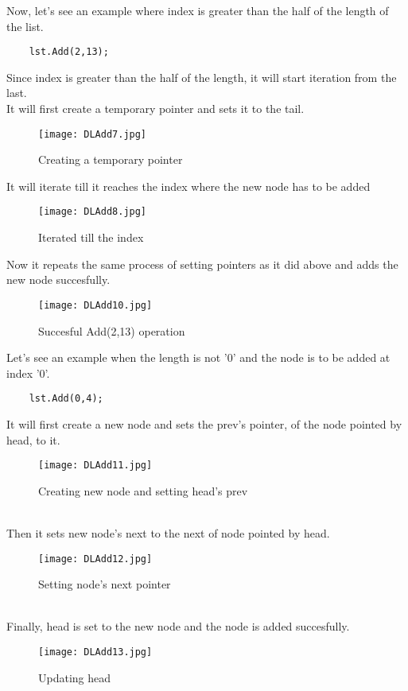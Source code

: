 \documentclass[11pt,fleqn]{book} %
\begin{document}
\begin{example}
	Now, let's see an example where index is greater than the half of the length of the list.\\
	\begin{lstlisting}
	lst.Add(2,13);
	\end{lstlisting}
	Since index is greater than the half of the length, it will start iteration from the last.\\
	It will first create a temporary pointer and sets it to the tail.
	\begin{figure}[H]
		\centering
		\texttt{[image: DLAdd7.jpg]}
		\caption{Creating a temporary pointer}
	\end{figure}
	It will iterate till it reaches the index where the new node has to be added
	\begin{figure}[H]
		\centering
		\texttt{[image: DLAdd8.jpg]}
		\caption{Iterated till the index}
	\end{figure}
	Now it repeats the same process of setting pointers as it did above and adds the new node succesfully.
	\begin{figure}[H]
		\centering
		\texttt{[image: DLAdd10.jpg]}
		\caption{Succesful Add(2,13) operation}
	\end{figure}
\end{example}
Let's see an example when the length is not '0' and the node is to be added at index '0'.
\begin{example}
	\begin{lstlisting}
	lst.Add(0,4);
	\end{lstlisting}
	It will first create a new node and sets the prev's pointer, of the node pointed by head, to it.
	\begin{figure}[H]
		\centering
		\texttt{[image: DLAdd11.jpg]}
		\caption{Creating new node and setting head's prev}
	\end{figure}~\\
	Then it sets new node's next to the next of node pointed by head.
	\begin{figure}[H]
		\centering
		\texttt{[image: DLAdd12.jpg]}
		\caption{Setting node's next pointer}
	\end{figure}~\\
	Finally, head is set to the new node and the node is added succesfully.
	\begin{figure}[H]
		\centering
		\texttt{[image: DLAdd13.jpg]}
		\caption{Updating head}
	\end{figure}
\end{example}
\end{document}
